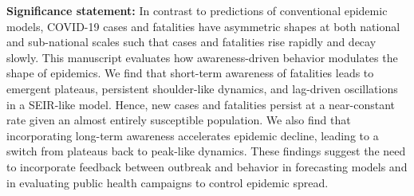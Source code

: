 \begin{boxit}
\noindent
\textbf{Significance statement:}
In contrast to predictions of conventional epidemic models,
COVID-19 cases and fatalities have asymmetric shapes at both national
and sub-national scales such that cases and fatalities 
rise rapidly and decay slowly.  This manuscript evaluates how awareness-driven
behavior modulates the shape of epidemics.
We find that short-term awareness of fatalities leads 
to emergent plateaus, persistent shoulder-like dynamics, and lag-driven
oscillations in a SEIR-like model.  
Hence, new cases and fatalities persist at 
a near-constant rate given an almost entirely susceptible population.
We also find that incorporating long-term awareness 
accelerates epidemic decline, leading to a switch from plateaus back to peak-like dynamics. 
These findings suggest the need to incorporate feedback
between outbreak and behavior in forecasting models and in evaluating public
health campaigns to control epidemic spread.
\end{boxit}
